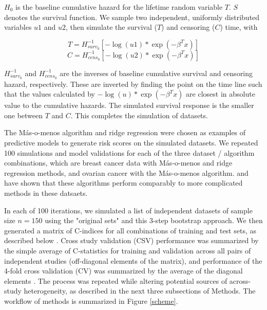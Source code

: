 \documentclass{bioinfo}
\begin{document}
    $H_{0}$ is the baseline cumulative hazard for the lifetime random variable $T$. $S$ denotes the survival function. We sample two independent, uniformly distributed
    variables $u1$ and $u2$, then simulate the survival ($T$) and censoring ($C$)
    time, with

    \begin{equation}\label{survivaltime}
      T = H_{surv_{0}}^{-1} [ - \log(u1) * \exp(-\beta^{T}x)]
    \end{equation}
    \begin{equation}\label{censoringtime}
      C = H_{cens_{0}}^{-1} [ - \log(u2) * \exp(-\beta^{T}x)]
    \end{equation}

    $H_{surv_{0}}^{-1}$ and $H_{cens_{0}}^{-1}$ are the inverses
    of baseline cumulative survival and censoring hazard, respectively.  These
    are inverted by finding
    the point on the time line such that the values calculated by
    $- \log(u) * \exp(- \beta^{T}x)$ are closest in absolute value to the
    cumulative hazards. The simulated survival response is the smaller one between
    $T$ and $C$. This completes the simulation of datasets.

	The M\'{a}s-o-menos algorithm \citep{Zhao2014, Donoho08 **Higher Criticism Thresholding:
Optimal Feature Selection when Useful Features are Rare and Weak**} and ridge 
	regression \citep{hoerl1970ridge} were chosen as
    examples of predictive models to generate risk scores on the simulated datasets. 
    We repeated 100 simulations and model validations 
    for each of the three dataset / algorithm combinations, 
    which are breast cancer data with M\'{a}s-o-menos and ridge regression methods, 
    and ovarian cancer with the M\'{a}s-o-menos
    algorithm. \citet{Bernau2014} and \citet{Zhao2014} have shown that these algorithms
    perform comparably to more complicated methods in these datsaets.
    
    In each of 100 iterations, we simulated a list of independent datasets of
    sample size $n=150$ using the "original sets" and this 3-step bootstrap approach.  We
    then generated a matrix of C-indices for all combinations of
    training and test sets, as described below
    \citep{Bernau2014}. %
    Cross study validation (CSV) performance was summarized by the
    simple average of C-statistics for training and validation across
    all pairs of independent studies (off-diagonal elements of the
    matrix), and performance of the 4-fold cross validation (CV) was summarized by the average
    of the diagonal elements \citep{Bernau2014}. The process was
    repeated while altering potential sources of across-study
    heterogeneity, as described in the next three subsections of
    Methods. The workflow of methods is summarized in Figure \ref{scheme}.
\end{document}
